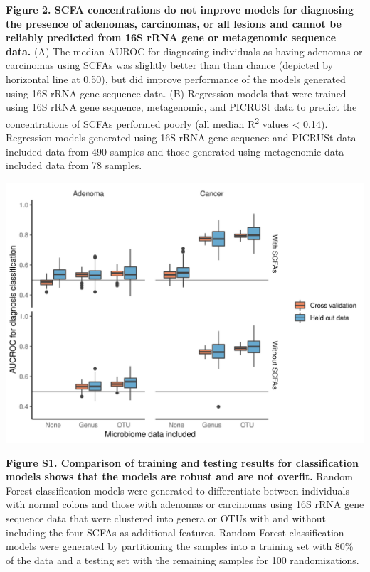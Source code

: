 \documentclass[11pt,]{article}
\begin{document}
\textbf{Figure 2. SCFA concentrations do not improve models for
diagnosing the presence of adenomas, carcinomas, or all lesions and
cannot be reliably predicted from 16S rRNA gene or metagenomic sequence
data.} (A) The median AUROC for diagnosing individuals as having
adenomas or carcinomas using SCFAs was slightly better than than chance
(depicted by horizontal line at 0.50), but did improve performance of
the models generated using 16S rRNA gene sequence data. (B) Regression
models that were trained using 16S rRNA gene sequence, metagenomic, and
PICRUSt data to predict the concentrations of SCFAs performed poorly
(all median R\textsuperscript{2} values \textless{} 0.14). Regression
models generated using 16S rRNA gene sequence and PICRUSt data included
data from 490 samples and those generated using metagenomic data
included data from 78 samples.

\newpage

\includegraphics{figure_s1.png}

\textbf{Figure S1. Comparison of training and testing results for
classification models shows that the models are robust and are not
overfit.} Random Forest classification models were generated to
differentiate between individuals with normal colons and those with
adenomas or carcinomas using 16S rRNA gene sequence data that were
clustered into genera or OTUs with and without including the four SCFAs
as additional features. Random Forest classification models were
generated by partitioning the samples into a training set with 80\% of
the data and a testing set with the remaining samples for 100
randomizations.

\newpage
\end{document}
